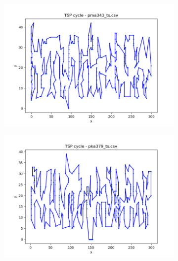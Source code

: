 \documentclass[12pt]{article}
\begin{document}
        \begin{figure}[htpb]
        \centering
            \begin{subfigure}[b]{0.475\textwidth}
                \includegraphics[width=\linewidth]{img/pma343_ts.png}
            \end{subfigure}
            \hfill
            \begin{subfigure}[b]{0.475\textwidth}
                \includegraphics[width=\linewidth]{img/pka379_ts.png}
            \end{subfigure}
            \begin{subfigure}[b]{0.475\textwidth}

\end{subfigure}
\end{figure}
\end{document}
